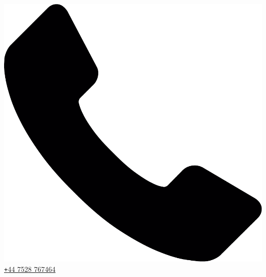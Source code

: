 \documentclass[10pt]{article} %
\begin{document}
{  \includegraphics[scale=0.018]{telephone5.pdf}
  \href{tel:+447528767464}{\texttt{+}44 7528 767464}
}

\end{document}
